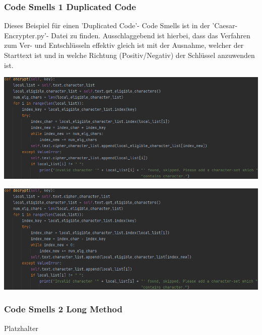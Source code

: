 \documentclass[12pt]{article}
\begin{document}
\subsubsection{Code Smells 1 Duplicated Code}
Dieses Beispiel für einen 'Duplicated Code'- Code Smells ist in der 'Caesar-Encrypter.py'- Datei zu finden. Ausschlaggebend ist hierbei, dass das Verfahren zum Ver- und Entschlüsseln effektiv gleich ist mit der Ausnahme, welcher der Starttext ist und in welche Richtung (Positiv/Negativ) der Schlüssel anzuwenden ist.
\begin{center}
	\includegraphics[width=15cm]{bilder/CodeSmells1_a.png}
\end{center}
\begin{center}
	\includegraphics[width=15cm]{bilder/CodeSmells1_b.png}
\end{center}

\subsubsection{Code Smells 2 Long Method}
Platzhalter
\end{document}
